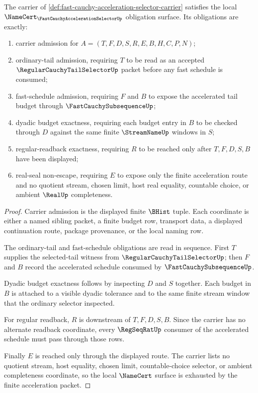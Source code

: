 \begin{theorem}
\label{thm:fast-cauchy-acceleration-selector-obligations}
The carrier of \autoref{def:fast-cauchy-acceleration-selector-carrier} satisfies the local $\NameCert_{\FastCauchyAccelerationSelectorUp}$ obligation surface. Its obligations are exactly:
\begin{enumerate}
\item carrier admission for $A=(T,F,D,S,R,E,B,H,C,P,N)$;
\item ordinary-tail admission, requiring $T$ to be read as an accepted $\RegularCauchyTailSelectorUp$ packet before any fast schedule is consumed;
\item fast-schedule admission, requiring $F$ and $B$ to expose the accelerated tail budget through $\FastCauchySubsequenceUp$;
\item dyadic budget exactness, requiring each budget entry in $B$ to be checked through $D$ against the same finite $\StreamNameUp$ windows in $S$;
\item regular-readback exactness, requiring $R$ to be reached only after $T,F,D,S,B$ have been displayed;
\item real-seal non-escape, requiring $E$ to expose only the finite acceleration route and no quotient stream, chosen limit, host real equality, countable choice, or ambient $\RealUp$ completeness.
\end{enumerate}
\end{theorem}
\begin{proof}
Carrier admission is the displayed finite $\BHist$ tuple. Each coordinate is either a named sibling packet, a finite budget row, transport data, a displayed continuation route, package provenance, or the local naming row.

The ordinary-tail and fast-schedule obligations are read in sequence. First $T$ supplies the selected-tail witness from $\RegularCauchyTailSelectorUp$; then $F$ and $B$ record the accelerated schedule consumed by $\FastCauchySubsequenceUp$.

Dyadic budget exactness follows by inspecting $D$ and $S$ together. Each budget in $B$ is attached to a visible dyadic tolerance and to the same finite stream window that the ordinary selector inspected.

For regular readback, $R$ is downstream of $T,F,D,S,B$. Since the carrier has no alternate readback coordinate, every $\RegSeqRatUp$ consumer of the accelerated schedule must pass through those rows.

Finally $E$ is reached only through the displayed route. The carrier lists no quotient stream, host equality, chosen limit, countable-choice selector, or ambient completeness coordinate, so the local $\NameCert$ surface is exhausted by the finite acceleration packet.
\end{proof}

